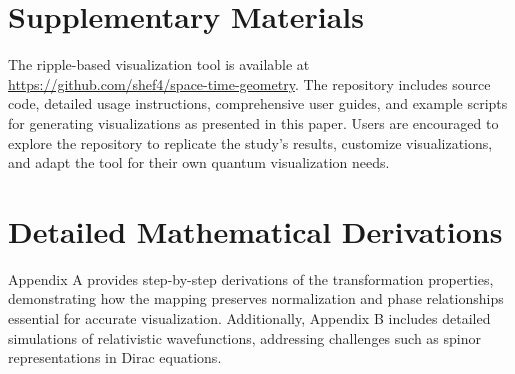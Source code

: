 \documentclass[12pt]{article}
\begin{document}
\section*{Supplementary Materials}
The ripple-based visualization tool is available at \url{https://github.com/shef4/space-time-geometry}. The repository includes source code, detailed usage instructions, comprehensive user guides, and example scripts for generating visualizations as presented in this paper. Users are encouraged to explore the repository to replicate the study's results, customize visualizations, and adapt the tool for their own quantum visualization needs.

\appendix
\section{Detailed Mathematical Derivations}
Appendix A provides step-by-step derivations of the transformation properties, demonstrating how the mapping preserves normalization and phase relationships essential for accurate visualization. Additionally, Appendix B includes detailed simulations of relativistic wavefunctions, addressing challenges such as spinor representations in Dirac equations.
\end{document}
